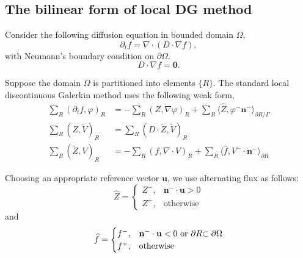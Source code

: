 \documentclass{article}
\numberwithin{equation}{section}
\begin{document}
\subsection{The bilinear form of local DG method}

Consider the following diffusion equation in bounded domain $\Omega$,
\begin{equation}
    \partial_{t}f=\nabla\cdot\left(D\cdot\nabla f\right),
\end{equation}
with Neumann's boundary condition on $\partial \Omega$. 
\begin{equation*}
    D\cdot\nabla f = \mathbf{0}.
\end{equation*}

Suppose the domain $\Omega$ is partitioned into elements $\{R\}$.  The standard local discontinuous Galerkin method uses the following weak form,
\begin{equation} \label{weakform-ldg}
    \begin{split}
        \sum_{R}\left(\partial_{t}f,\varphi\right)_{R}
        &=-\sum_{R}\left(Z,\nabla\varphi\right)_{R}+\sum_{R}\langle\widehat{Z},\varphi^{-}\mathbf{n}^{-}\rangle_{\partial R/\Gamma}\\
        \sum_{R}\left(Z,\widetilde{V}\right)_{R}
        &=\sum_{R}\left(D\cdot\widetilde{Z},\widetilde{V}\right)_{R}\\
        \sum_{R}\left(\widetilde{Z},V\right)_{R}
        &=-\sum_{R}\left(f,\nabla\cdot V\right)_{R}+\sum_{R}\langle\widehat{f},V^{-}\cdot\mathbf{n}^{-}\rangle_{\partial R}
    \end{split}
\end{equation}

Choosing an appropriate reference vector $\mathbf{u}$, we use alternating flux as follows:
\begin{equation}\label{Zflux}
    \widehat{Z}=\begin{cases}
Z^{-}, & \mathbf{n}^{-}\cdot\mathbf{u}>0\\
Z^{+}, & \text{otherwise}
\end{cases}
\end{equation}
and
\begin{equation}\label{fflux}
    \widehat{f}=\begin{cases}
f^{-}, & \mathbf{n}^{-}\cdot\mathbf{u}<0\ \text{or\ \ensuremath{\partial R}\ensuremath{\subset\partial\Omega}}\\
f^{+}, & \text{otherwise}
\end{cases}
\end{equation}
\end{document}
